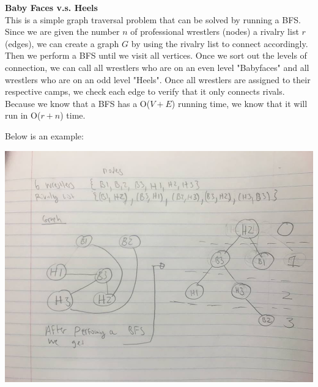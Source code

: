 \documentclass[11pt]{article}
\begin{document}
\begin{solution} \textbf{Baby Faces v.s. Heels}\\

	This is a simple graph traversal problem that can be solved by running a BFS. Since we are given the number $n$ of professional wrestlers (nodes) a rivalry list $r$ (edges), we can create a graph $G$ by using the rivalry list to connect accordingly. Then we perform a BFS until we visit all vertices. Once we sort out the levels of connection, we can call all wrestlers who are on an even level "Babyfaces" and all wrestlers who are on an odd level "Heels". Once all wrestlers are assigned to their respective camps, we check each edge to verify that it only connects rivals. Because we know that a BFS has a O($V + E$) running time, we know that it will run in O($r + n$) time. 
	
	
	\hfil
	
	Below is an example:
	
	\hfil
	
	\begin{center}
		\includegraphics[scale=0.5]{3}
	\end{center}
	

\end{solution}
\end{document}

